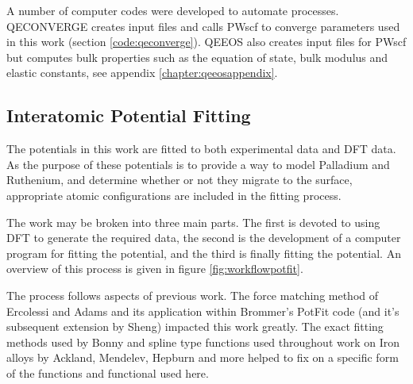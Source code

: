 A number of computer codes were developed to automate processes.  QECONVERGE creates input files and calls PWscf to converge parameters used in this work (section \ref{code:qeconverge}).  QEEOS also creates input files for PWscf but computes bulk properties such as the equation of state, bulk modulus and elastic constants, see appendix \ref{chapter:qeeosappendix}.

\subsection{Interatomic Potential Fitting}

The potentials in this work are fitted to both experimental data and DFT data.  As the purpose of these potentials is to provide a way to model Palladium and Ruthenium, and determine whether or not they migrate to the surface, appropriate atomic configurations are included in the fitting process.

The work may be broken into three main parts.  The first is devoted to using DFT to generate the required data, the second is the development of a computer program for fitting the potential, and the third is finally fitting the potential.  An overview of this process is given in figure \ref{fig:workflowpotfit}.

The process follows aspects of previous work.  The force matching method of Ercolessi and Adams\cite{forcematchingmethod} and its application within Brommer's PotFit code\cite{pbrommer} (and it's subsequent extension by Sheng\cite{shengeam}) impacted this work greatly.  The exact fitting methods used by Bonny and spline type functions used throughout work on Iron alloys by Ackland, Mendelev, Hepburn and more helped to fix on a specific form of the functions and functional used here.

